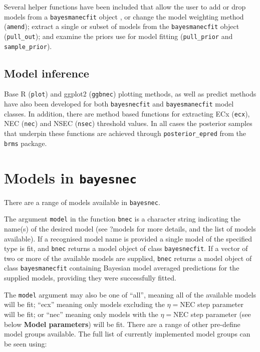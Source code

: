 \documentclass[10pt,a4paper,onecolumn]{article}
\begin{document}
Several helper functions have been included that allow the user to add
or drop models from a \texttt{bayesmanecfit} object , or change the
model weighting method (\texttt{amend}); extract a single or subset of
models from the \texttt{bayesmanecfit} object (\texttt{pull\_out}); and
examine the priors use for model fitting (\texttt{pull\_prior} and
\texttt{sample\_prior}).

\hypertarget{model-inference}{%
\subsection{Model inference}\label{model-inference}}

Base R (\texttt{plot}) and ggplot2 (\texttt{ggbnec}) plotting methods,
as well as predict methods have also been developed for both
\texttt{bayesnecfit} and \texttt{bayesmanecfit} model classes. In
addition, there are method based functions for extracting ECx
(\texttt{ecx}), NEC (\texttt{nec}) and NSEC (\texttt{nsec}) threshold
values. In all cases the posterior samples that underpin these functions
are achieved through \texttt{posterior\_epred} from the \texttt{brms}
package.

\hypertarget{models-in-bayesnec}{%
\section{\texorpdfstring{Models in
\texttt{bayesnec}}{Models in bayesnec}}\label{models-in-bayesnec}}

There are a range of models available in \texttt{bayesnec}.

The argument \texttt{model} in the function \texttt{bnec} is a character
string indicating the name(s) of the desired model (see ?models for more
details, and the list of models available). If a recognised model name
is provided a single model of the specified type is fit, and
\texttt{bnec} returns a model object of class \texttt{bayesnecfit}. If a
vector of two or more of the available models are supplied,
\texttt{bnec} returns a model object of class \texttt{bayesmanecfit}
containing Bayesian model averaged predictions for the supplied models,
providing they were successfully fitted.

The \texttt{model} argument may also be one of ``all'', meaning all of
the available models will be fit; ``ecx'' meaning only models excluding
the \(\eta = \text{NEC}\) step parameter will be fit; or ``nec'' meaning
only models with the \(\eta = \text{NEC}\) step parameter (see below
\textbf{Model parameters}) will be fit. There are a range of other
pre-define model groups available. The full list of currently
implemented model groups can be seen using:
\end{document}
